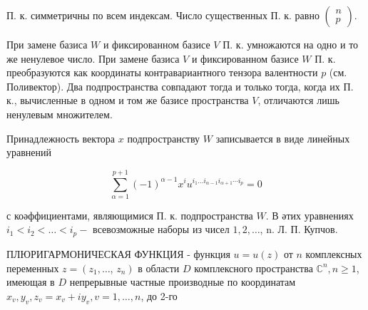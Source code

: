 \documentclass[10pt]{article}
\begin{document}
П. к. симметричны по всем индексам. Число существенных П. к. равно $\left(\begin{array}{l}n \\ p\end{array}\right)$.



При замене базиса $W$ и фиксированном базисе $V$ П. к. умножаются на одно и то же ненулевое число. При замене базиса $V$ и фиксированном базисе $W$ П. к. преобразуются как координаты контравариантного тензора валентности $p$ (см. Поливектор). Два подпространства совпадают тогда и только тогда, когда их П. к., вычисленные в одном и том же базисе пространства $V$, отличаются лишь ненулевым множителем.



Принадлежность вектора $x$ подпространству $W$ записывается в виде линейных уравнений



\[

\sum_{\alpha=1}^{p+1}(-1)^{\alpha-1} x^{i} u^{i_{1} \ldots i_{\alpha-1} i_{\alpha+1} \cdots i_{p}}=0

\]



с коәффициентами, являющимися П. к. подпространства $W$. В әтих уравнениях $i_{1}<i_{2}<\ldots<i_{p}-$ всевозможные наборы из чисел $1,2, \ldots$, n. Л. П. Купчов.



ПЛЮРИГАРМОНИЧЕСКАЯ ФУНКЦИЯ - функция $u=u(z)$ от $n$ комплексных переменных $z=\left(z_{1}, \ldots\right.$, $\left.z_{n}\right)$ в области $D$ комплексного пространства $\mathbb{C}^{n}, n \geqslant 1$, имеющая в $D$ непрерывные частные производные по координатам $x_{v}, y_{v}, z_{v}=x_{v}+i y_{v}, v=1, \ldots, n$, до 2-го
\end{document}
